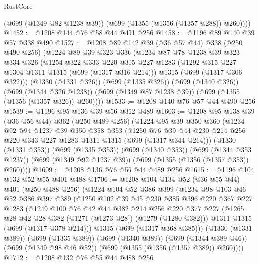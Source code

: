 \begin{lexlean}{RustCore}
\begin{coremodule}
        (@699 (@1349 @82 @1238 @39))
        (@699 (@1355 (@1356 (@1357 @288)) @260))))
@1452 := @1208 @144 @76 @58 @44 @491 @256
@1458 := @1196 @89 @140 @39 @57 @338 @490
@1527 := @1208
    @89
    @142
    @39
    (@36 @57 @44)
    @338
    (@250 @490 @256)
    (@1224
      @89
      @39
      @323
      @336
      (@1234
        @87
        @78
        @1238
        @39
        @323
        @334
        @326
        (@1254
          @322
          @333
          @220
          @305
          @227
          @1283
          (@1292 @315 @227 @1304 @1311 @1315 (@699 (@1317 @316 @214)))
          @1315
          (@699 (@1317 @306 @322)))
        (@1330 (@1331 @326))
        (@699 (@1335 @326))
        (@699 (@1340 @326))
        (@699 (@1344 @326 @1238))
        (@699 (@1349 @87 @1238 @39))
        (@699 (@1355 (@1356 (@1357 @326)) @260))))
@1533 := @1208 @140 @76 @57 @44 @490 @256
@1539 := @1196 @95 @136 @39 @56 @362 @489
@1603 := @1208
    @95
    @138
    @39
    (@36 @56 @44)
    @362
    (@250 @489 @256)
    (@1224
      @95
      @39
      @350
      @360
      (@1234
        @92
        @94
        @1237
        @39
        @350
        @358
        @353
        (@1250 @76 @39 @44 @230 @214 @256 @220 @343 @227 @1283 @1311 @1315 (@699 (@1317 @344 @214)))
        (@1330 (@1331 @353))
        (@699 (@1335 @353))
        (@699 (@1340 @353))
        (@699 (@1344 @353 @1237))
        (@699 (@1349 @92 @1237 @39))
        (@699 (@1355 (@1356 (@1357 @353)) @260))))
@1609 := @1208 @136 @76 @56 @44 @489 @256
@1615 := @1196 @104 @132 @52 @55 @401 @488
@1706 := @1208
    @104
    @134
    @52
    (@36 @55 @44)
    @401
    (@250 @488 @256)
    (@1224
      @104
      @52
      @386
      @399
      (@1234
        @98
        @103
        @46
        @52
        @386
        @397
        @389
        (@1250
          @102
          @39
          @45
          @230
          @385
          @396
          @220
          @367
          @227
          @1283
          (@1249
            @100
            @76
            @42
            @44
            @382
            @214
            @256
            @220
            @377
            @227
            (@1265 @28 @42 @28 @382 (@1271 (@1273 @28)) (@1279 (@1280 @382)))
            @1311
            @1315
            (@699 (@1317 @378 @214)))
          @1315
          (@699 (@1317 @368 @385)))
        (@1330 (@1331 @389))
        (@699 (@1335 @389))
        (@699 (@1340 @389))
        (@699 (@1344 @389 @46))
        (@699 (@1349 @98 @46 @52))
        (@699 (@1355 (@1356 (@1357 @389)) @260))))
@1712 := @1208 @132 @76 @55 @44 @488 @256

\end{coremodule}
\end{lexlean}
